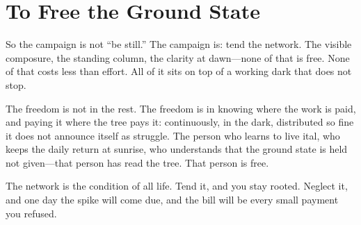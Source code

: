\documentclass[12pt]{article}
\begin{document}
\section{To Free the Ground State}

So the campaign is not ``be still.'' The campaign is: tend the network. The visible composure, the standing column, the clarity at dawn---none of that is free. None of that costs less than effort. All of it sits on top of a working dark that does not stop.

The freedom is not in the rest. The freedom is in knowing where the work is paid, and paying it where the tree pays it: continuously, in the dark, distributed so fine it does not announce itself as struggle. The person who learns to live ital, who keeps the daily return at sunrise, who understands that the ground state is held not given---that person has read the tree. That person is free.

The network is the condition of all life. Tend it, and you stay rooted. Neglect it, and one day the spike will come due, and the bill will be every small payment you refused.
\end{document}

